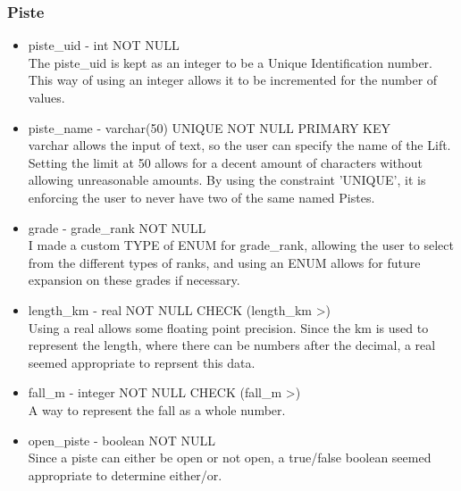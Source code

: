 \documentclass[11pt]{scrartcl} %
\begin{document}
\subsubsection{Piste}
\begin{itemize}
\item piste\_uid - int NOT NULL\\
The piste\_uid is kept as an integer to be a Unique Identification number. This way of using an integer allows it to be incremented for the number of values.
\item piste\_name - varchar(50) UNIQUE NOT NULL PRIMARY KEY\\
varchar allows the input of text, so the user can specify the name of the Lift. Setting the limit at 50 allows for a decent amount of characters without allowing unreasonable amounts. By using the constraint 'UNIQUE', it is enforcing the user to never have two of the same named Pistes.
\item grade - grade\_rank NOT NULL\\
I made a custom TYPE of ENUM for grade\_rank, allowing the user to select from the different types of ranks, and using an ENUM allows for future expansion on these grades if necessary.
\item length\_km - real NOT NULL CHECK (length\_km \textgreater {})\\
Using a real allows some floating point precision. Since the km is used to represent the length, where there can be numbers after the decimal, a real seemed appropriate to reprsent this data.
\item fall\_m - integer NOT NULL CHECK (fall\_m \textgreater {})\\
A way to represent the fall as a whole number.
\item open\_piste - boolean NOT NULL\\
Since a piste can either be open or not open, a true/false boolean seemed appropriate to determine either/or.
\end{itemize}
\end{document}
